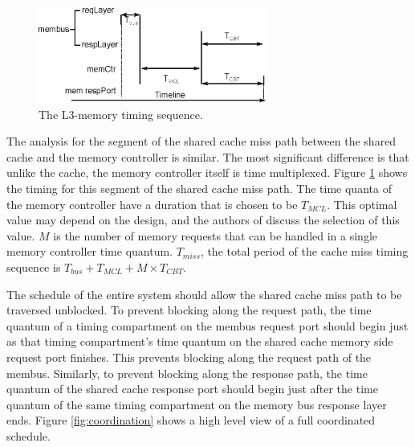 
\begin{figure}
    \begin{center}
        \includegraphics[width=2.9475in]{figs/miss_timing.eps}
        \caption{The L3-memory timing sequence.}
        \label{fig:miss_timing}
    \end{center}
\end{figure}

The analysis for the segment of the shared cache miss path between the shared 
cache and the memory controller is similar. The most significant difference is 
that unlike the cache, the memory controller itself is time multiplexed. Figure 
\ref{fig:miss_timing} shows the timing for this segment of the shared cache 
miss path. The time quanta of the memory controller have a duration that is 
chosen to be $T_{MCL}$. This optimal value may depend on the design, and
the authors of \cite{ushpca14} discuss the selection of this value. $M$ is the 
number of memory requests that can be handled in a single memory controller 
time quantum.
$T_{miss}$, the total period of the cache miss timing sequence is 
$T_{bus}+T_{MCL}+M\times T_{CBT}$.

The schedule of the entire system should allow the shared cache miss path to be 
traversed unblocked.
To prevent blocking along the request path, the time quantum of a timing 
compartment on the membus request port should begin just as that timing 
compartment's time quantum on the shared cache memory side request port 
finishes. This prevents blocking along the request path of the membus.
Similarly, to prevent blocking along the response path, the time quantum of the 
shared cache response port should begin just after the time quantum of the same 
timing compartment on the memory bus response layer ends. Figure 
\ref{fig:coordination}
shows a high level view of a full coordinated schedule.

